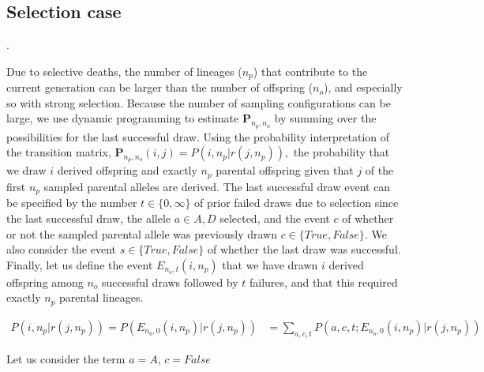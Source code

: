 \documentclass[review]{elsarticle}
\newcommand{\sgcomment}[1]{{\color{red}{SG: #1}}}
\newcommand{\ikcomment}[1]{{\color{blue}{IK: #1}}}
\begin{document}
\subsection{Selection case}

\ikcomment{I've changed the event $r$ to $c$ in the main text (to avoid the unlikely confusing for
  $r$, the number of failures). This will need to be propagated in here, too}.

Due to selective deaths, the number of lineages ($n_p$) that contribute to the current generation
can be larger than the number of offspring ($n_o$), and especially so with strong selection. Because
the number of sampling configurations can be large, we use dynamic programming to estimate
$\mathbf{P}_{n_p,n_o}$ by summing over the possibilities for the last successful draw. Using the
probability interpretation of the transition matrix,
$\mathbf{P}_{n_p,n_o}(i,j) = P(i, n_p | r(j, n_p)),$ the probability that we draw $i$ derived
offspring and exactly $n_p$ parental offspring given that $j$ of the first $n_p$ sampled parental
alleles are derived. The last successful draw event can be specified by the number
$t \in \{0,\infty\}$ of prior failed draws due to selection since the last successful draw, the
allele $a \in {A, D}$ selected, and the event $c$ of whether or not the sampled parental allele was
previously drawn $c\in \{True, False\}$. We also consider the event $s \in \{True, False\}$ of
whether the last draw was successful. Finally, let us define the event $E_{n_o,t}(i,n_p)$ that we
have drawn $i$ derived offspring among $n_o$ successful draws followed by $t$ failures, and that
this required exactly $n_p$ parental lineages.

\begin{equation}
\begin{split}
P(i, n_p | r(j, n_p)) = P(E_{n_0,0}(i,n_p)  | r(j, n_p)) &=  \sum_{a, c,t} P(a,c,t; E_{n_o,0}(i,n_p)  | r(j, n_p)) 
 \end{split}
\end{equation}

Let us consider the term $a=A$, $c=False$ \sgcomment{We could use a better notation here, eg using
  tikz. }
\end{document}
